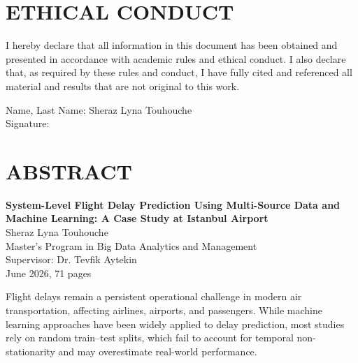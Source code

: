 \documentclass{report}
\begin{document}
\setcounter{page}{3}

\chapter*{ETHICAL CONDUCT}
I hereby declare that all information in this document has been obtained and
presented in accordance with academic rules and ethical conduct. I also declare
that, as required by these rules and conduct, I have fully cited and referenced all
material and results that are not original to this work.

\vspace{2cm}
Name, Last Name: Sheraz Lyna Touhouche\\
Signature:


\chapter*{ABSTRACT}






\begin{center}
\textbf{System-Level Flight Delay Prediction Using Multi-Source Data and Machine Learning: A Case Study at Istanbul Airport}\\
Sheraz Lyna Touhouche\\
Master’s Program in Big Data Analytics and Management\\
Supervisor: Dr. Tevfik Aytekin\\
June 2026, 71 pages


\end{center}





\vspace{1cm}

\vspace{1em}

Flight delays remain a persistent operational challenge in modern air transportation, affecting airlines, airports, and passengers. While machine learning approaches have been widely applied to delay prediction, most studies rely on random train–test splits, which fail to account for temporal non-stationarity and may overestimate real-world performance.
\end{document}
